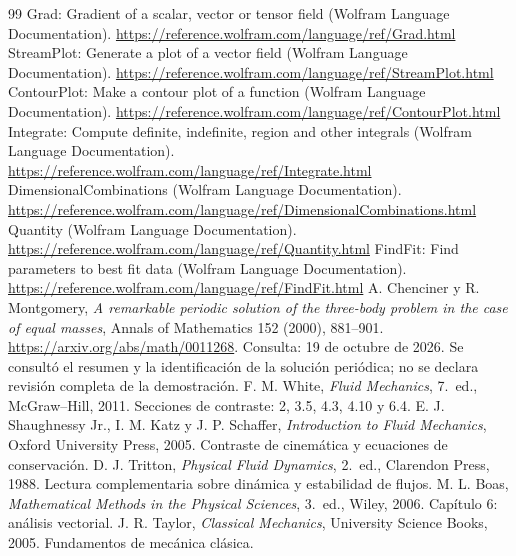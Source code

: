 \documentclass[10pt,openany]{book}
\begin{document}
\begin{thebibliography}{99}
 Grad: Gradient of a scalar, vector or tensor field (Wolfram Language Documentation). \url{https://reference.wolfram.com/language/ref/Grad.html}
 StreamPlot: Generate a plot of a vector field (Wolfram Language Documentation). \url{https://reference.wolfram.com/language/ref/StreamPlot.html}
 ContourPlot: Make a contour plot of a function (Wolfram Language Documentation). \url{https://reference.wolfram.com/language/ref/ContourPlot.html}
 Integrate: Compute definite, indefinite, region and other integrals (Wolfram Language Documentation). \url{https://reference.wolfram.com/language/ref/Integrate.html}
 DimensionalCombinations (Wolfram Language Documentation). \url{https://reference.wolfram.com/language/ref/DimensionalCombinations.html}
 Quantity (Wolfram Language Documentation). \url{https://reference.wolfram.com/language/ref/Quantity.html}
 FindFit: Find parameters to best fit data (Wolfram Language Documentation). \url{https://reference.wolfram.com/language/ref/FindFit.html}
 A. Chenciner y R. Montgomery, \emph{A remarkable periodic solution of the three-body problem in the case of equal masses}, Annals of Mathematics 152 (2000), 881--901. \url{https://arxiv.org/abs/math/0011268}. Consulta: 19 de octubre de 2026. Se consultó el resumen y la identificación de la solución periódica; no se declara revisión completa de la demostración.
 F. M. White, \emph{Fluid Mechanics}, 7.\ ed., McGraw--Hill, 2011. Secciones de contraste: 2, 3.5, 4.3, 4.10 y 6.4.
 E. J. Shaughnessy Jr., I. M. Katz y J. P. Schaffer, \emph{Introduction to Fluid Mechanics}, Oxford University Press, 2005. Contraste de cinemática y ecuaciones de conservación.
 D. J. Tritton, \emph{Physical Fluid Dynamics}, 2.\ ed., Clarendon Press, 1988. Lectura complementaria sobre dinámica y estabilidad de flujos.
 M. L. Boas, \emph{Mathematical Methods in the Physical Sciences}, 3.\ ed., Wiley, 2006. Capítulo 6: análisis vectorial.
 J. R. Taylor, \emph{Classical Mechanics}, University Science Books, 2005. Fundamentos de mecánica clásica.
\end{thebibliography}
\end{document}
